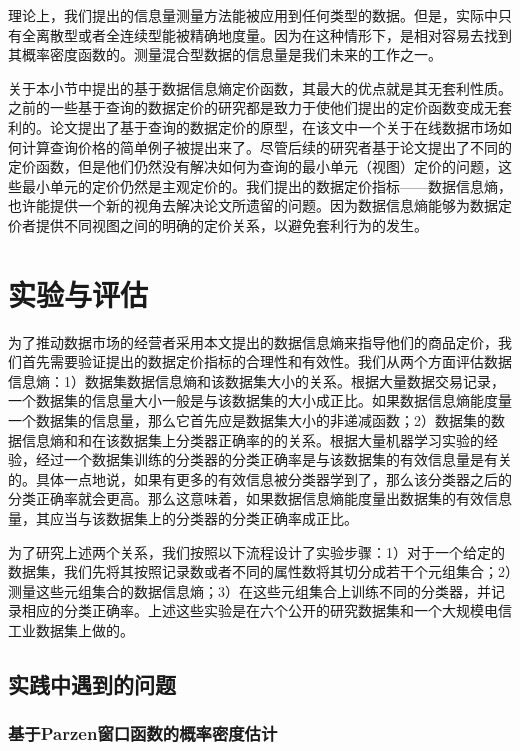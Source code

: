 理论上，我们提出的信息量测量方法能被应用到任何类型的数据。但是，实际中只有全离散型或者全连续型能被精确地度量。因为在这种情形下，是相对容易去找到其概率密度函数的。测量混合型数据的信息量是我们未来的工作之一。

关于本小节中提出的基于数据信息熵定价函数，其最大的优点就是其无套利性质。之前的一些基于查询的数据定价的研究\cite{balazinska2011data,koutris2012querymarket,koutris2015query}都是致力于使他们提出的定价函数变成无套利的。论文\cite{balazinska2011data}提出了基于查询的数据定价的原型，在该文中一个关于在线数据市场如何计算查询价格的简单例子被提出来了。尽管后续的研究者基于论文\cite{balazinska2011data}提出了不同的定价函数，但是他们仍然没有解决如何为查询的最小单元（视图）定价的问题，这些最小单元的定价仍然是主观定价的。我们提出的数据定价指标——数据信息熵，也许能提供一个新的视角去解决论文\cite{balazinska2011data,koutris2012querymarket,koutris2015query}所遗留的问题。因为数据信息熵能够为数据定价者提供不同视图之间的明确的定价关系，以避免套利行为的发生。


\section{实验与评估}
\label{sec:evaluation}
为了推动数据市场的经营者采用本文提出的数据信息熵来指导他们的商品定价，我们首先需要验证提出的数据定价指标的合理性和有效性。我们从两个方面评估数据信息熵：1）数据集数据信息熵和该数据集大小的关系。根据大量数据交易记录，一个数据集的信息量大小一般是与该数据集的大小成正比。如果数据信息熵能度量一个数据集的信息量，那么它首先应是数据集大小的非递减函数；2）数据集的数据信息熵和和在该数据集上分类器正确率的的关系。根据大量机器学习实验的经验，经过一个数据集训练的分类器的分类正确率是与该数据集的有效信息量是有关的。具体一点地说，如果有更多的有效信息被分类器学到了，那么该分类器之后的分类正确率就会更高。那么这意味着，如果数据信息熵能度量出数据集的有效信息量，其应当与该数据集上的分类器的分类正确率成正比。

为了研究上述两个关系，我们按照以下流程设计了实验步骤：1）对于一个给定的数据集，我们先将其按照记录数或者不同的属性数将其切分成若干个元组集合；2）测量这些元组集合的数据信息熵；3）在这些元组集合上训练不同的分类器，并记录相应的分类正确率。上述这些实验是在六个公开的研究数据集和一个大规模电信工业数据集上做的。

\subsection{实践中遇到的问题}

\subsubsection{基于Parzen窗口函数的概率密度估计}
\label{subsubsec:parzen_window}

